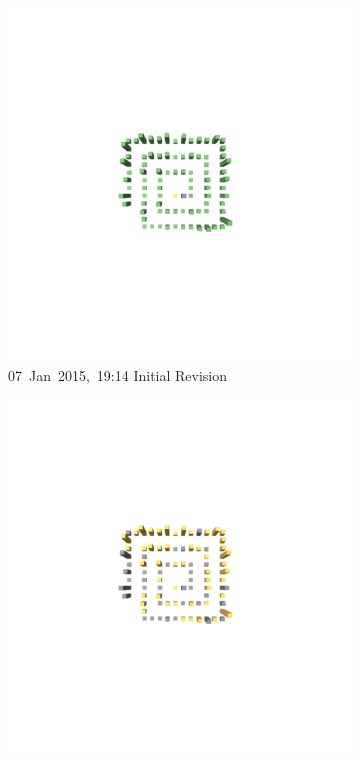 \begin{figure}[ht]
\begin{subfigure}{0.32\textwidth}
        \includegraphics[width=\linewidth]{JetUML_V0S2.png}
        \caption{\mbox{07 Jan 2015, 19:14}  \hfill  \linebreak  Initial Revision} 
        \label{fig:JetUML_V0S2}
    \end{subfigure}
    \hspace*{\fill}
    \begin{subfigure}{0.32\textwidth}
        \includegraphics[width=\linewidth]{JetUML_V0S3.png}

\end{subfigure}
\end{figure}
